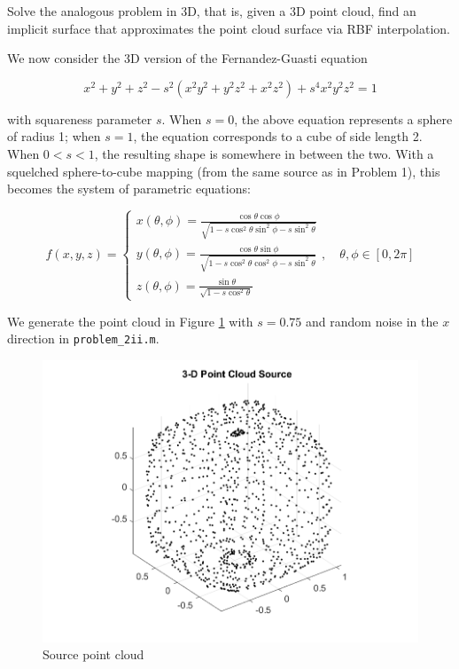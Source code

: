 Solve the analogous problem in 3D, that is, given a 3D point cloud, find an implicit surface that approximates the point
cloud surface via RBF interpolation.

\begin{solution}
  We now consider the 3D version of the Fernandez-Guasti equation

  $$
  x^2 + y^2 + z^2 - s^2 \left(x^2 y^2 + y^2 z^2 + x^2 z^2 \right) + s^4 x^2 y^2 z^2 = 1
  $$

  with squareness parameter $s$. When $s = 0$, the above equation represents a sphere of radius 1; when $s = 1$, the 
  equation corresponds to a cube of side length 2. When $0 < s < 1$, the resulting shape is somewhere in between the 
  two. With a squelched sphere-to-cube mapping (from the same source as in Problem 1), this becomes the system of 
  parametric equations:

  $$
  f(x, y, z) = \begin{cases}
    x(\theta, \phi) = \frac{\cos{\theta} \cos{\phi}}{\sqrt{1 - s \cos^2{\theta} \sin^2{\phi} - s \sin^2{\theta}}} \\
    y(\theta, \phi) = \frac{\cos{\theta} \sin{\phi}}{\sqrt{1 - s \cos^2{\theta} \cos^2{\phi} - s \sin^2{\theta}}} \\
    z(\theta, \phi) = \frac{\sin{\theta}}{\sqrt{1 - s \cos^2{\theta}}}
  \end{cases}, \quad \theta, \phi \in [0, 2 \pi]
  $$

  We generate the point cloud in Figure \ref{fig:problem_2ii_source_cloud} with $s=0.75$ and random noise in the $x$ 
  direction in \texttt{problem\_2ii.m}. 
 
  \begin{figure}[h]
    \centering
    \includegraphics[width=.9\textwidth]{problem_2ii_source_cloud.png}
    \caption{Source point cloud}
    \label{fig:problem_2ii_source_cloud}
  \end{figure}
 

\end{solution}
